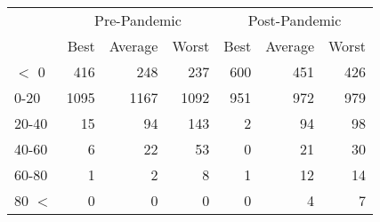 
\begin{tabular}[t]{lrrrrrr}
\toprule
\multicolumn{1}{c}{ } & \multicolumn{3}{c}{Pre-Pandemic} & \multicolumn{3}{c}{Post-Pandemic} \\
\cmidrule(l{3pt}r{3pt}){2-4} \cmidrule(l{3pt}r{3pt}){5-7}
 & Best & Average & Worst & Best & Average & Worst\\
\midrule
$<$ 0 & 416 & 248 & 237 & 600 & 451 & 426\\
0-20 & 1095 & 1167 & 1092 & 951 & 972 & 979\\
20-40 & 15 & 94 & 143 & 2 & 94 & 98\\
40-60 & 6 & 22 & 53 & 0 & 21 & 30\\
60-80 & 1 & 2 & 8 & 1 & 12 & 14\\
80 $<$ & 0 & 0 & 0 & 0 & 4 & 7\\
\bottomrule
\end{tabular}
